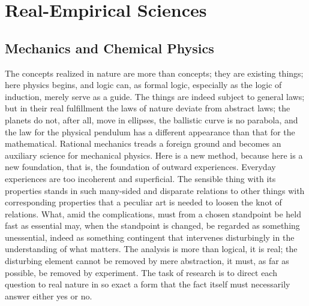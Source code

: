 \documentclass[12pt]{book}
\begin{document}
\chapter{Real-Empirical Sciences}

\section{Mechanics and Chemical Physics}
\label{sec:14}

\noindent The concepts realized in nature are more than concepts; they are existing
things; here physics begins, and logic can, as formal logic, especially as the logic
of induction, merely serve as a guide. The things are indeed subject to general
laws; but in their real fulfillment the laws of nature deviate from abstract laws;
the planets do not, after all, move in ellipses, the ballistic curve is no parabola,
and the law for the physical pendulum has a different appearance than that for the
mathematical. Rational mechanics treads a foreign ground and becomes an auxiliary
science for mechanical physics. Here is a new method, because here is a new
foundation, that is, the foundation of outward experiences. Everyday experiences are
too incoherent and superficial. The sensible thing with its properties stands in such
many-sided and disparate relations to other things with corresponding properties that
a peculiar art is needed to loosen the knot of relations. What, amid the
complications, must from a chosen standpoint be held fast as essential may, when the
standpoint is changed, be regarded as something unessential, indeed as something
contingent that intervenes disturbingly in the understanding of what matters. The
analysis is more than logical, it is real; the disturbing element cannot be removed by
mere abstraction, it must, as far as possible, be removed by experiment. The task of
research is to direct each question to real nature in so exact a form that the fact
itself must necessarily answer either yes or no.
\end{document}
